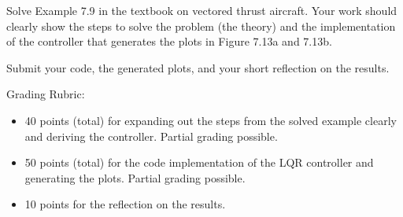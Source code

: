 \documentclass{ee122_pset}
\author{\rule{3cm}{0.4pt}} %
\begin{document}
 Solve Example 7.9 in the textbook on vectored thrust aircraft. Your work should clearly show the steps to solve the problem (the theory) and the implementation of the controller that generates the plots in Figure 7.13a and 7.13b. 

Submit your code, the generated plots, and your short reflection on the results.

Grading Rubric:
\begin{itemize}
    \item 40 points (total) for expanding out the steps from the solved example clearly and deriving the controller. Partial grading possible.
    \item 50 points (total) for the code implementation of the LQR controller and generating the plots. Partial grading possible.
    \item 10 points for the reflection on the results.
\end{itemize}
\end{document}
